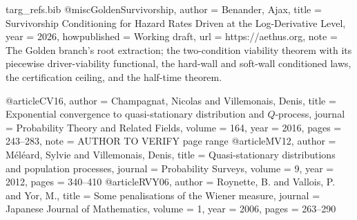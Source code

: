 \begin{filecontents}[overwrite]{targ_refs.bib}
@misc{GoldenSurvivorship,
  author       = {Benander, Ajax},
  title        = {Survivorship Conditioning for Hazard Rates Driven at the Log-Derivative Level},
  year         = {2026},
  howpublished = {Working draft},
  url          = {https://aethus.org},
  note         = {The Golden branch's root extraction; the two-condition viability
                  theorem with its piecewise driver-viability functional, the
                  hard-wall and soft-wall conditioned laws, the certification
                  ceiling, and the half-time theorem.}
}

@article{CV16,
  author  = {Champagnat, Nicolas and Villemonais, Denis},
  title   = {Exponential convergence to quasi-stationary distribution and {$Q$}-process},
  journal = {Probability Theory and Related Fields},
  volume  = {164},
  year    = {2016},
  pages   = {243--283},
  note    = {AUTHOR TO VERIFY page range}
}
@article{MV12,
  author  = {M{\'e}l{\'e}ard, Sylvie and Villemonais, Denis},
  title   = {Quasi-stationary distributions and population processes},
  journal = {Probability Surveys},
  volume  = {9},
  year    = {2012},
  pages   = {340--410}
}
@article{RVY06,
  author  = {Roynette, B. and Vallois, P. and Yor, M.},
  title   = {Some penalisations of the {W}iener measure},
  journal = {Japanese Journal of Mathematics},
  volume  = {1},
  year    = {2006},
  pages   = {263--290}
}
\end{filecontents}
\documentclass[11pt]{article}
\usepackage[margin=1.1in]{geometry}
\usepackage{amsmath,amssymb,amsthm,mathtools}
\usepackage{booktabs,enumitem,url,xcolor}
\usepackage[colorlinks=true,linkcolor=blue!50!black,citecolor=blue!50!black,urlcolor=blue!50!black]{hyperref}
\usepackage[style=numeric, sorting=none]{biblatex}

